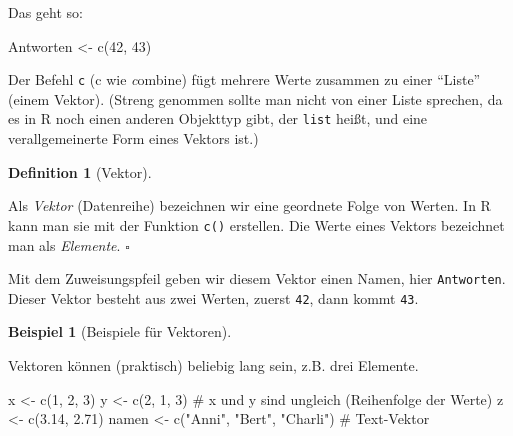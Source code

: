 \documentclass[
  letterpaper,
]{scrbook}
\newenvironment{Shaded}{\begin{snugshade}}{\end{snugshade}}
\newcommand{\CommentTok}[1]{\textcolor[rgb]{0.37,0.37,0.37}{#1}}
\newcommand{\DecValTok}[1]{\textcolor[rgb]{0.68,0.00,0.00}{#1}}
\newcommand{\FloatTok}[1]{\textcolor[rgb]{0.68,0.00,0.00}{#1}}
\newcommand{\FunctionTok}[1]{\textcolor[rgb]{0.28,0.35,0.67}{#1}}
\newcommand{\NormalTok}[1]{\textcolor[rgb]{0.00,0.23,0.31}{#1}}
\newcommand{\OtherTok}[1]{\textcolor[rgb]{0.00,0.23,0.31}{#1}}
\newcommand{\StringTok}[1]{\textcolor[rgb]{0.13,0.47,0.30}{#1}}
\theoremstyle{definition}
\theoremstyle{definition}
\newtheorem{example}{Beispiel}[chapter]
\theoremstyle{definition}
\newtheorem{definition}{Definition}[chapter]
\theoremstyle{remark}
\begin{document}
Das geht so:

\begin{Shaded}
\begin{Highlighting}[]
\NormalTok{Antworten }\OtherTok{\textless{}{-}} \FunctionTok{c}\NormalTok{(}\DecValTok{42}\NormalTok{, }\DecValTok{43}\NormalTok{)}
\end{Highlighting}
\end{Shaded}

Der Befehl \texttt{c} (c wie \emph{c}ombine) fügt mehrere Werte zusammen
zu einer \enquote{Liste} (einem Vektor). (Streng genommen sollte man
nicht von einer Liste sprechen, da es in R noch einen anderen Objekttyp
gibt, der \texttt{list} heißt, und eine verallgemeinerte Form eines
Vektors ist.)

\begin{definition}[Vektor]\protect\hypertarget{def-vektor}{}\label{def-vektor}

Als \emph{Vektor} (Datenreihe) bezeichnen wir eine geordnete Folge von
Werten. In R kann man sie mit der Funktion \texttt{c()} erstellen. Die
Werte eines Vektors bezeichnet man als \emph{Elemente}. \(\square\)

\end{definition}

Mit dem Zuweisungspfeil geben wir diesem Vektor einen Namen, hier
\texttt{Antworten}. Dieser Vektor besteht aus zwei Werten, zuerst
\texttt{42}, dann kommt \texttt{43}.

\begin{example}[Beispiele für
Vektoren]\protect\hypertarget{exm-vektoren}{}\label{exm-vektoren}

Vektoren können (praktisch) beliebig lang sein, z.B. drei Elemente.

\begin{Shaded}
\begin{Highlighting}[]
\NormalTok{x }\OtherTok{\textless{}{-}} \FunctionTok{c}\NormalTok{(}\DecValTok{1}\NormalTok{, }\DecValTok{2}\NormalTok{, }\DecValTok{3}\NormalTok{)}
\NormalTok{y }\OtherTok{\textless{}{-}} \FunctionTok{c}\NormalTok{(}\DecValTok{2}\NormalTok{, }\DecValTok{1}\NormalTok{, }\DecValTok{3}\NormalTok{)  }\CommentTok{\# x und y sind ungleich (Reihenfolge der Werte)}
\NormalTok{z }\OtherTok{\textless{}{-}} \FunctionTok{c}\NormalTok{(}\FloatTok{3.14}\NormalTok{, }\FloatTok{2.71}\NormalTok{)  }
\NormalTok{namen }\OtherTok{\textless{}{-}} \FunctionTok{c}\NormalTok{(}\StringTok{"Anni"}\NormalTok{, }\StringTok{"Bert"}\NormalTok{, }\StringTok{"Charli"}\NormalTok{) }\CommentTok{\# Text{-}Vektor}
\end{Highlighting}
\end{Shaded}

\end{example}
\end{document}
